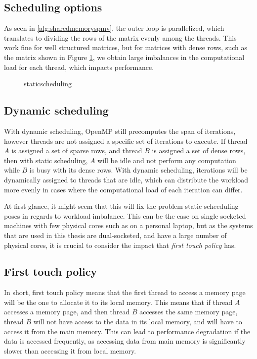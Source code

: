 \subsection{Scheduling options}
As seen in \autoref{alg:sharedmemoryspmv}, the outer loop is parallelized, which translates to dividing the rows of the matrix evenly among the threads. This work fine for well structured matrices, but for matrices with dense rows, such as the matrix shown in Figure \ref{fig:staticscheduling}, we obtain large imbalances in the computational load for each thread, which impacts performance. 

\begin{figure}[H]
    \centering
    \caption{staticscheduling}
    \label{fig:staticscheduling}
\end{figure}

\subsection{Dynamic scheduling}
With dynamic scheduling, OpenMP still precomputes the span of iterations, however threads are not assigned a specific set of iterations to execute. If thread \(A\) is assigned a set of sparse rows, and thread \(B\) is assigned a set of dense rows, then with static scheduling, \(A\) will be idle and not perform any computation while \(B\) is busy with its dense rows. With dynamic scheduling, iterations will be dynamically assigned to threads that are idle, which can distribute the workload more evenly in cases where the computational load of each iteration can differ. 
\medskip

At first glance, it might seem that this will fix the problem static schecduling poses in regards to workload imbalance. This can be the case on single socketed machines with few physical cores such as on a personal laptop, but as the systems that are used in this thesis are dual-socketed, and have a large number of physical cores, it is crucial to consider the impact that \textit{first touch policy} has.

\subsection{First touch policy}
In short, first touch policy means that the first thread to access a memory page will be the one to allocate it to its local memory. This means that if thread \(A\) accesses a memory page, and then thread \(B\) accesses the same memory page, thread \(B\) will not have access to the data in its local memory, and will have to access it from the main memory. This can lead to performance degradation if the data is accessed frequently, as accessing data from main memory is significantly slower than accessing it from local memory. 



